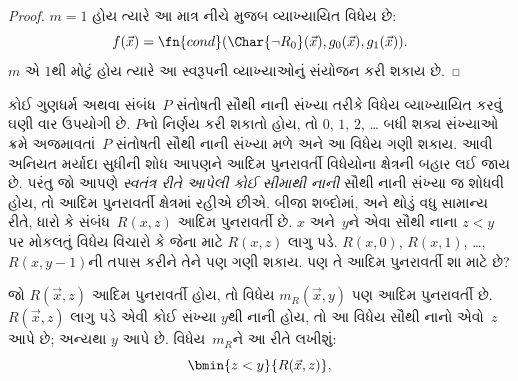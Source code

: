 \begin{proof}
  $m = 1$ હોય ત્યારે આ માત્ર નીચે મુજબ વ્યાખ્યાયિત વિધેય છે:
  \[
  f(\vec x) = \fn{cond}(\Char{\lnot R_0}(\vec x),g_0(\vec x),g_1(\vec
  x)).
  \]
  $m$ એ $1$થી મોટું હોય ત્યારે આ સ્વરૂપની વ્યાખ્યાઓનું સંયોજન
  કરી શકાય છે.
\end{proof}
\endgroup


\begingroup
\makeatletter{}\makeatother

\label{guunit:OLP-0218}


\begin{explain}
કોઈ ગુણધર્મ અથવા સંબંધ~$P$ સંતોષતી સૌથી નાની સંખ્યા તરીકે વિધેય
વ્યાખ્યાયિત કરવું ઘણી વાર ઉપયોગી છે. $P$નો નિર્ણય કરી શકાતો હોય,
તો $0$, $1$, $2$, \dots{} બધી શક્ય સંખ્યાઓ ક્રમે અજમાવતાં~$P$
સંતોષતી સૌથી નાની સંખ્યા મળે અને આ વિધેય ગણી શકાય. આવી અનિયત
મર્યાદા સુધીની શોધ આપણને આદિમ પુનરાવર્તી વિધેયોના ક્ષેત્રની બહાર લઈ
જાય છે. પરંતુ જો આપણે \emph{સ્વતંત્ર રીતે આપેલી કોઈ સીમાથી નાની}
સૌથી નાની સંખ્યા જ શોધવી હોય, તો આદિમ પુનરાવર્તી ક્ષેત્રમાં રહીએ
છીએ. બીજા શબ્દોમાં, અને થોડું વધુ સામાન્ય રીતે, ધારો કે
સંબંધ~$R(x,z)$ આદિમ પુનરાવર્તી છે. $x$ અને~$y$ને એવા સૌથી નાના
$z < y$ પર મોકલતું વિધેય વિચારો કે જેના માટે $R(x, z)$ લાગુ પડે.
$R(x, 0)$, $R(x, 1)$, \dots, $R(x, y-1)$ની તપાસ કરીને તેને પણ
ગણી શકાય. પણ તે આદિમ પુનરાવર્તી શા માટે છે?
\end{explain}

\begin{prop}
જો $R(\vec x, z)$ આદિમ પુનરાવર્તી હોય, તો વિધેય
$m_R(\vec{x}, y)$ પણ આદિમ પુનરાવર્તી છે. $R(\vec x, z)$ લાગુ પડે
એવી કોઈ સંખ્યા $y$થી નાની હોય, તો આ વિધેય સૌથી નાનો એવો~$z$ આપે
છે; અન્યથા $y$ આપે છે. વિધેય~$m_R$ને આ રીતે લખીશું:
\[
\bmin{z < y}{R(\vec{x}, z)},
\]
\end{prop}

